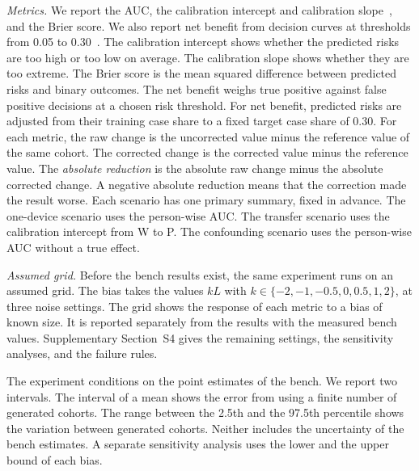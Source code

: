 \emph{Metrics.}
We report the AUC, the calibration intercept and calibration slope~\cite{VanCalster2019}, and the Brier score.
We also report net benefit from decision curves at thresholds from 0.05 to 0.30~\cite{Vickers2006}.
The calibration intercept shows whether the predicted risks are too high or too low on average.
The calibration slope shows whether they are too extreme.
The Brier score is the mean squared difference between predicted risks and binary outcomes.
The net benefit weighs true positive against false positive decisions at a chosen risk threshold.
For net benefit, predicted risks are adjusted from their training case share to a fixed target case share of 0.30.
For each metric, the raw change is the uncorrected value minus the reference value of the same cohort.
The corrected change is the corrected value minus the reference value.
The \emph{absolute reduction} is the absolute raw change minus the absolute corrected change.
A negative absolute reduction means that the correction made the result worse.
Each scenario has one primary summary, fixed in advance.
The one-device scenario uses the person-wise AUC.
The transfer scenario uses the calibration intercept from W to P.
The confounding scenario uses the person-wise AUC without a true effect.

\emph{Assumed grid.}
Before the bench results exist, the same experiment runs on an assumed grid.
The bias takes the values $kL$ with $k\in\{-2,-1,-0.5,0,0.5,1,2\}$, at three noise settings.
The grid shows the response of each metric to a bias of known size.
It is reported separately from the results with the measured bench values.
Supplementary Section~S4 gives the remaining settings, the sensitivity analyses, and the failure rules.

The experiment conditions on the point estimates of the bench.
We report two intervals.
The interval of a mean shows the error from using a finite number of generated cohorts.
The range between the 2.5th and the 97.5th percentile shows the variation between generated cohorts.
Neither includes the uncertainty of the bench estimates.
A separate sensitivity analysis uses the lower and the upper bound of each bias.
